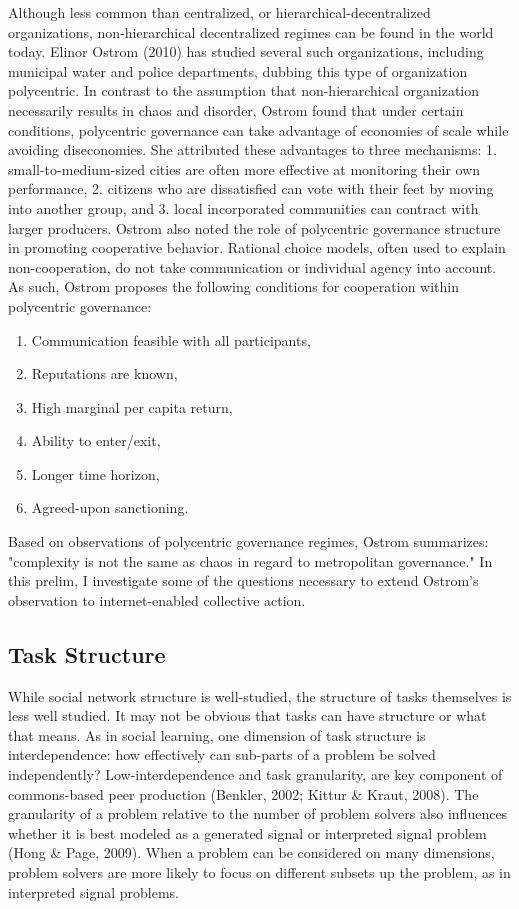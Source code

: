 Although less common than centralized, or hierarchical-decentralized organizations, non-hierarchical decentralized regimes can be found in the world today. Elinor Ostrom (2010) has studied several such organizations, including municipal water and police departments, dubbing this type of organization polycentric. In contrast to the assumption that non-hierarchical organization necessarily results in chaos and disorder, Ostrom found that under certain conditions, polycentric governance can take advantage of economies of scale while avoiding diseconomies. She attributed these advantages to three mechanisms: 1. small-to-medium-sized cities are often more effective at monitoring their own performance, 2. citizens who are dissatisfied can vote with their feet by moving into another group, and 3. local incorporated communities can contract with larger producers. Ostrom also noted the role of polycentric governance structure in promoting cooperative behavior. Rational choice models, often used to explain non-cooperation, do not take communication or individual agency into account. As such, Ostrom proposes the following conditions for cooperation within polycentric governance:
\begin{enumerate}
\item{Communication feasible with all participants,}
\item{Reputations are known,}
\item{High marginal per capita return,}
\item{Ability to enter/exit,}
\item{Longer time horizon,}
\item{Agreed-upon sanctioning.}
\end{enumerate}

Based on observations of polycentric governance regimes, Ostrom summarizes: "complexity is not the same as chaos in regard to metropolitan governance." In this prelim, I investigate some of the questions necessary to extend Ostrom's observation to internet-enabled collective action.

\subsection{Task Structure}
While social network structure is well-studied, the structure of tasks themselves is less well studied. It may not be obvious that tasks can have structure or what that means. As in social learning, one dimension of task structure is interdependence: how effectively can sub-parts of a problem be solved independently? Low-interdependence and task granularity, are key component of commons-based peer production (Benkler, 2002; Kittur \& Kraut, 2008). The granularity of a problem relative to the number of problem solvers also influences whether it is best modeled as a generated signal or interpreted signal problem (Hong \& Page, 2009). When a problem can be considered on many dimensions, problem solvers are more likely to focus on different subsets up the problem, as in interpreted signal problems.

